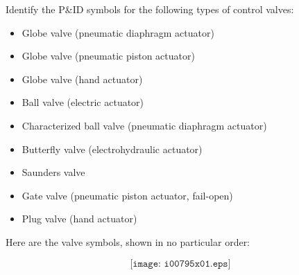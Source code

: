 

Identify the P\&ID symbols for the following types of control valves:

\begin{itemize}
\item{}Globe valve (pneumatic diaphragm actuator)
\item{}Globe valve (pneumatic piston actuator)
\item{}Globe valve (hand actuator)
\item{}Ball valve (electric actuator)
\item{}Characterized ball valve (pneumatic diaphragm actuator)
\item{}Butterfly valve (electrohydraulic actuator)
\item{}Saunders valve
\item{}Gate valve (pneumatic piston actuator, fail-open)
\item{}Plug valve (hand actuator)
\end{itemize}







Here are the valve symbols, shown in no particular order:

$$\texttt{[image: i00795x01.eps]}$$










